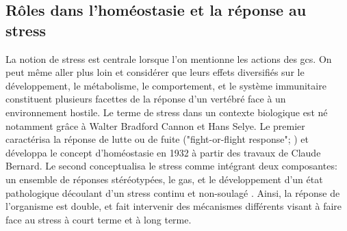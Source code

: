 \documentclass[../main.tex]{subfiles}
\begin{document}
	\subsection{Rôles dans l'homéostasie et la réponse au stress}\label{subsec:gc-role-stress}
		La notion de stress est centrale lorsque l'on mentionne les actions des \glspl{gc}.
		On peut même aller plus loin et considérer que leurs effets diversifiés sur le développement, le métabolisme, le comportement, et le système immunitaire constituent plusieurs facettes de la réponse d'un vertébré face à un environnement hostile.
		Le terme de stress dans un contexte biologique est né notamment grâce à Walter Bradford Cannon et Hans Selye.
		Le premier caractérisa la réponse de lutte ou de fuite ("fight-or-flight response"; \citealp{Cannon1915}) et développa le concept d'homéostasie en 1932 à partir des travaux de Claude Bernard.
		Le second conceptualisa le stress comme intégrant deux composantes:
		un ensemble de réponses stéréotypées, le \gls{gas}, et le développement d'un état pathologique découlant d'un stress continu et non-soulagé \citep{Selye1946}.
		Ainsi, la réponse de l'organisme est double, et fait intervenir des mécanismes différents visant à faire face au stress à court terme et à long terme.

		
\end{document}
